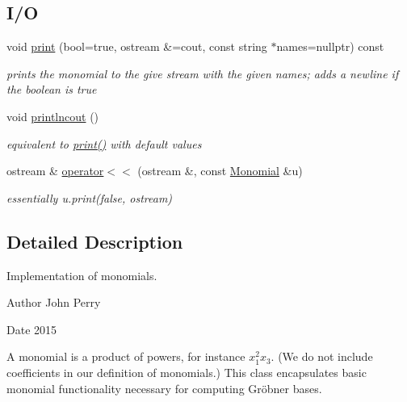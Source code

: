 \subsection*{I/O}
\begin{DoxyCompactItemize}
\item 
\mbox{\label{class_monomial_ad428399071b7e7b63604d506b5dfdf93}} 
void \hyperlink{class_monomial_ad428399071b7e7b63604d506b5dfdf93}{print} (bool=true, ostream \&=cout, const string $\ast$names=nullptr) const
\begin{DoxyCompactList}\small\item\em prints the monomial to the give stream with the given names; adds a newline if the boolean is true \end{DoxyCompactList}\item 
\mbox{\label{class_monomial_a339f1927077ab6d92b050d222d945f72}} 
void \hyperlink{class_monomial_a339f1927077ab6d92b050d222d945f72}{printlncout} ()
\begin{DoxyCompactList}\small\item\em equivalent to {\ttfamily \hyperlink{class_monomial_ad428399071b7e7b63604d506b5dfdf93}{print()}} with default values \end{DoxyCompactList}\item 
\mbox{\label{class_monomial_a76dc21e1d0624ecd913ce3e2f83c0f13}} 
ostream \& \hyperlink{class_monomial_a76dc21e1d0624ecd913ce3e2f83c0f13}{operator$<$$<$} (ostream \&, const \hyperlink{class_monomial}{Monomial} \&u)
\begin{DoxyCompactList}\small\item\em essentially {\ttfamily u.\+print(false, ostream)} \end{DoxyCompactList}\end{DoxyCompactItemize}


\subsection{Detailed Description}
Implementation of monomials. 

\begin{DoxyAuthor}{Author}
John Perry 
\end{DoxyAuthor}
\begin{DoxyDate}{Date}
2015
\end{DoxyDate}
A monomial is a product of powers, for instance $x_1^2x_3$. (We do not include coefficients in our definition of monomials.) This class encapsulates basic monomial functionality necessary for computing Gr\"{o}bner bases.

